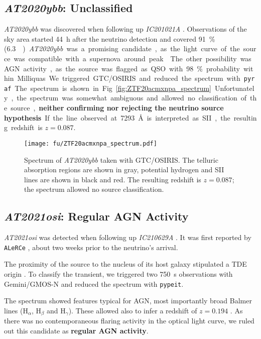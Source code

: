 \subsection{\emph{AT2020ybb}: Unclassified}
\emph{AT2020ybb} was discovered when following up \emph{IC201021A} . Observations of the sky area started \SI{44}{\hour} after the neutrino detection and covered \SI{91}{\percent} (\SI{6.3}{\square\deg}).

\emph{AT2020ybb} was a promising candidate, as the light curve of the source was compatible with a supernova around peak . The other possibility was AGN activity, as the source was flagged as QSO with \SI{98}{\percent} probability within Milliquas.

We triggered GTC/OSIRIS and reduced the spectrum with \texttt{pyraf}. The spectrum is shown in Fig. \ref{fig:ZTF20acmxnpa_spectrum}. Unfortunately, the spectrum was somewhat ambiguous and allowed no classification of the source, \textbf{neither confirming nor rejecting the neutrino source hypothesis}. If the line observed at \SI{7293}{\angstrom} is interpreted as SII, the resulting redshift is $z=0.087$.

\begin{figure}[htb]
    \texttt{[image: fu/ZTF20acmxnpa\_spectrum.pdf]}
    \caption[\emph{AT2020ybb} spectrum]{Spectrum of \emph{AT2020ybb} taken with GTC/OSIRIS. The telluric absorption regions are shown in gray, potential hydrogen and SII lines are shown in black and red. The resulting redshift is $z=0.087$; the spectrum allowed no source classification.}
\end{figure}

\subsection{\emph{AT2021osi}: Regular AGN Activity}
\emph{AT2021osi} was detected when following up \emph{IC210629A} . It was first reported by \texttt{ALeRCe} , about two weeks prior to the neutrino's arrival. 

The proximity of the source to the nucleus of its host galaxy stipulated a TDE origin . To classify the transient, we triggered two \SI{750}{\second} observations with Gemini/GMOS-N and reduced the spectrum with \texttt{pypeit}.

The spectrum showed features typical for AGN, most importantly broad Balmer lines ($\text{H}_\alpha$, $\text{H}_\beta$ and $\text{H}_\gamma$). These allowed also to infer a redshift of $z=0.194$ . As there was no contemporaneous flaring activity in the optical light curve, we ruled out this candidate as \textbf{regular AGN activity}.

